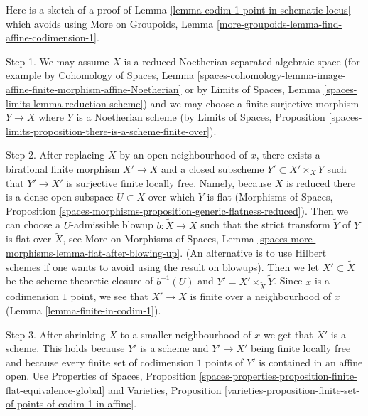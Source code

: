 \begin{remark}
\label{remark-alternate-proof-scheme-codim-1}
Here is a sketch of a proof of
Lemma \ref{lemma-codim-1-point-in-schematic-locus}
which avoids using
More on Groupoids, Lemma
\ref{more-groupoids-lemma-find-affine-codimension-1}.

\medskip\noindent
Step 1. We may assume $X$ is a reduced Noetherian separated algebraic space
(for example by Cohomology of Spaces, Lemma
\ref{spaces-cohomology-lemma-image-affine-finite-morphism-affine-Noetherian}
or by
Limits of Spaces, Lemma \ref{spaces-limits-lemma-reduction-scheme})
and we may choose a finite surjective morphism
$Y \to X$ where $Y$ is a Noetherian scheme (by
Limits of Spaces, Proposition
\ref{spaces-limits-proposition-there-is-a-scheme-finite-over}).

\medskip\noindent
Step 2. After replacing $X$ by an open neighbourhood of $x$, there
exists a birational finite morphism $X' \to X$ and a closed subscheme
$Y' \subset X' \times_X Y$ such that $Y' \to X'$ is surjective
finite locally free. Namely, because $X$ is reduced there is a dense
open subspace $U \subset X$ over which $Y$ is flat (Morphisms of Spaces,
Proposition \ref{spaces-morphisms-proposition-generic-flatness-reduced}).
Then we can choose a $U$-admissible blowup $b : \tilde X \to X$ such
that the strict transform $\tilde Y$ of $Y$ is flat over $\tilde X$, see
More on Morphisms of Spaces, Lemma
\ref{spaces-more-morphisms-lemma-flat-after-blowing-up}.
(An alternative is to use Hilbert schemes if one wants to avoid using
the result on blowups).
Then we let $X' \subset \tilde X$ be the scheme theoretic
closure of $b^{-1}(U)$ and $Y' = X' \times_{\tilde X} \tilde Y$.
Since $x$ is a codimension $1$ point, we see that $X' \to X$ is finite over a
neighbourhood of $x$ (Lemma \ref{lemma-finite-in-codim-1}).

\medskip\noindent
Step 3. After shrinking $X$ to a smaller neighbourhood of $x$ we get that
$X'$ is a scheme. This holds because $Y'$ is a scheme and $Y' \to X'$
being finite locally free and because every finite set of codimension $1$
points of $Y'$ is contained in an affine open. Use
Properties of Spaces, Proposition
\ref{spaces-properties-proposition-finite-flat-equivalence-global}
and
Varieties, Proposition
\ref{varieties-proposition-finite-set-of-points-of-codim-1-in-affine}.


\end{remark}
